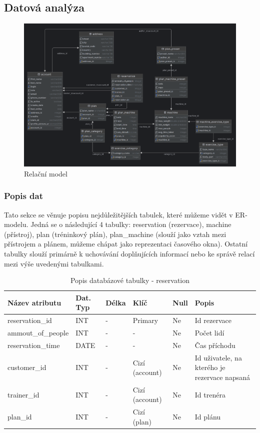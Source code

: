 \subsection{Datová analýza}

\begin{figure}[h!]
	\includegraphics[width=1\textwidth]{Figures/ermodel.png}
	\caption{ Relační model}
	\label{fig:RelationalModel}
\end{figure}

\subsubsection{Popis dat}
Tato sekce se věnuje popisu nejdůležitějších tabulek, které můžeme vidět v ER-modelu. Jedná se o následující 4 tabulky: reservation (rezervace), machine (přístroj), plan (tréninkový plán), plan\_machine (slouží jako vztah mezi přístrojem a plánem, můžeme chápat jako reprezentaci časového okna). Ostatní tabulky slouží primárně k uchovávání doplňujících informací nebo ke správě relací mezi výše uvedenými tabulkami.

\begin{table}[h!]
	\caption{Popis databázové tabulky - reservation}
    \label{tab:dat-dictionary-reservation}
	\begin{tabular}{|p{3.5cm}|p{2cm}|p{1cm}|p{2.5cm}|p{.75cm}|p{3.75cm}|}
		\hline
        \textbf{Název atributu} & \textbf{Dat. Typ} & \textbf{Délka} & \textbf{Klíč} & \textbf{Null} & \textbf{Popis} \\
        \hline
        reservation\_id & INT & - & Primary & Ne & Id rezervace \\
        \hline
        ammout\_of\_people & INT & - & - & Ne & Počet lidí \\
        \hline
        reservation\_time & DATE & - & - & Ne & Čas příchodu \\
        \hline
        customer\_id & INT & - & Cizí (account) & Ne & Id uživatele, na kterého je rezervace napsaná \\
        \hline
        trainer\_id & INT & - & Cizí (account) & Ne & Id trenéra \\
        \hline
        plan\_id & INT & - & Cizí (plan) & Ne & Id plánu \\
        \hline
	\end{tabular}
\end{table}

